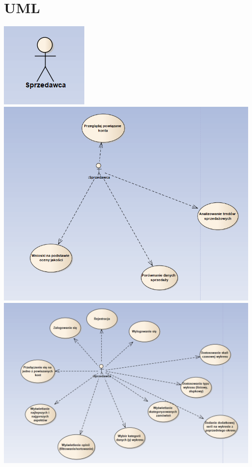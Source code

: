 \documentclass[a4paper,11pt]{article}
\begin{document}
\begin{enumerate}
\begin{enumerate}
    \end{enumerate}
\end{enumerate}

\section{UML}
\includegraphics[scale=0.5]{src/u8.png}\\
\includegraphics[scale=0.5]{src/u1.png}\\
\includegraphics[scale=0.5]{src/u2.png}\\
\end{document}
